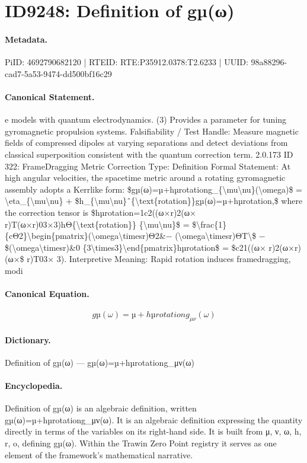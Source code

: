 \section*{ID9248: Definition of gµ(ω)}
\paragraph{Metadata.}
PiID: 4692790682120 | RTEID: RTE:P35912.0378:T2.6233 | UUID: 98a88296-cad7-5a53-9474-dd500bf16c29

\paragraph{Canonical Statement.}
e models with quantum electrodynamics. (3) Provides a parameter for tuning gyromagnetic propulsion systems. Falsifiability / Test Handle: Measure magnetic fields of compressed dipoles at varying separations and detect deviations from classical superposition consistent with the quantum correction term. 2.0.173 ID 322: FrameDragging Metric Correction Type: Definition Formal Statement: At high angular velocities, the spacetime metric around a rotating gyromagnetic assembly adopts a Kerrlike form: \$gµ(ω)=µ+hµrotationg\_\{\textbackslash{}mu\textbackslash{}nu\}(\textbackslash{}omega)\$ = \textbackslash{}eta\_\{\textbackslash{}mu\textbackslash{}nu\} + \$h\_\{\textbackslash{}mu\textbackslash{}nu\}ˆ\{\textbackslash{}text\{rotation\}\}gµ(ω)=µ+hµrotation,\$ where the correction tensor is \$hµrotation=1c2((ω×r)2(ω× r)T(ω×r)03×3)hΘ\{\textbackslash{}text\{rotation\}\} \{\textbackslash{}mu\textbackslash{}nu\}\$ = \$\textbackslash{}frac\{1\}\{cΘ2\}\textbackslash{}begin\{pmatrix\}(\textbackslash{}omega\textbackslash{}timesr)Θ2\&− (\textbackslash{}omega\textbackslash{}timesr)ΘT\textbackslash{}\$ − \$(\textbackslash{}omega\textbackslash{}timesr)\&0 \{3\textbackslash{}times3\}\textbackslash{}end\{pmatrix\}hµrotation\$ = \$c21((ω× r)2(ω×r)(ω×\$ r)T03× 3). Interpretive Meaning: Rapid rotation induces framedragging, modi

\paragraph{Canonical Equation.}
\[
gµ(ω)=µ+hµrotationg_{\mu\nu}(\omega)
\]

\paragraph{Dictionary.}
Definition of gµ(ω) — gµ(ω)=µ+hµrotationg\_μν(ω)

\paragraph{Encyclopedia.}
Definition of gµ(ω) is an algebraic definition, written gµ(ω)=µ+hµrotationg\_μν(ω). It is an algebraic definition expressing the quantity directly in terms of the variables on its right-hand side. It is built from μ, ν, ω, h, r, o, defining gµ(ω). Within the Trawin Zero Point registry it serves as one element of the framework's mathematical narrative.
